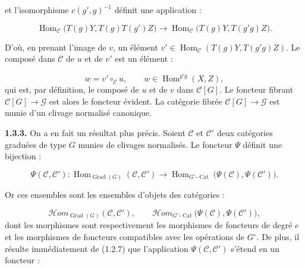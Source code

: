 %
et l'isomorphisme $c(g',g)^{-1}$ définit une application :

\begin{equation}
  \operatorname{Hom}_{\mathcal C}
    \bigl(T(g)Y,T(g)T(g')Z\bigr)
  \longrightarrow
  \operatorname{Hom}_{\mathcal C}
    \bigl(T(g)Y,T(g'g)Z\bigr).
  \tag{1.3.2.4}
\end{equation}

D'où, en prenant l'image de $v$, un élément
$v'\in\operatorname{Hom}_{\mathcal C}(T(g)Y,T(g'g)Z)$. Le composé dans
$\mathcal C$ de $u$ et de $v'$ est un élément :

\begin{equation}
  w=v'\mathbin{\circ_{\mathcal C}}u,
  \qquad w\in\operatorname{Hom}^{g'g}(X,Z),
  \tag{1.3.2.5}
\end{equation}
qui est, par définition, le composé de $u$ et de $v$ dans
$\mathcal C[G]$. Le foncteur fibrant $\mathcal C[G]\to\mathcal G$ est
alors le foncteur évident. La catégorie fibrée
$\mathcal C[G]\to\mathcal G$ est munie d'un clivage normalisé canonique.

\noindent\textbf{1.3.3.}\quad
On a en fait un résultat plus précis. Soient $\mathcal C$ et
$\mathcal C'$ deux catégories graduées de type $G$ munies de clivages
normalisés. Le foncteur $\Psi$ définit une bijection :

\begin{equation}
  \Psi(\mathcal C,\mathcal C')\colon
  \operatorname{Hom}_{\operatorname{Grad}(G)}(\mathcal C,\mathcal C')
  \longrightarrow
  \operatorname{Hom}_{G^\circ\text{-}\operatorname{Cat}}
    \bigl(\Psi(\mathcal C),\Psi(\mathcal C')\bigr).
  \tag{1.3.3.1}
\end{equation}

Or ces ensembles sont les ensembles d'objets des catégories :

\begin{equation}
  \mathcal{H}\!om_{\operatorname{Grad}(G)}(\mathcal C,\mathcal C'),
  \qquad
  \mathcal{H}\!om_{G^\circ\text{-}\operatorname{Cat}}
    \bigl(\Psi(\mathcal C),\Psi(\mathcal C')\bigr),
  \tag{1.3.3.2}
\end{equation}
dont les morphismes sont respectivement les morphismes de foncteurs de
degré $e$ et les morphismes de foncteurs compatibles avec les opérations
de $G^\circ$. De plus, il résulte immédiatement de (1.2.7) que
l'application $\Psi(\mathcal C,\mathcal C')$ s'étend en un foncteur :

